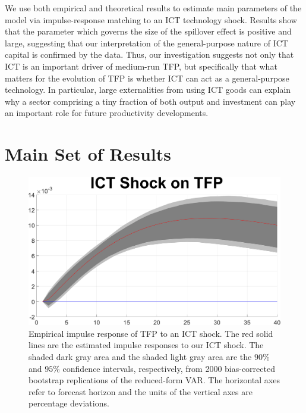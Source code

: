 \documentclass[12pt]{article}
\begin{document}
We use both empirical and theoretical results to estimate main parameters of the model via impulse-response matching to an ICT technology shock. Results show that the parameter which governs the size of the spillover effect is positive and large, suggesting that our interpretation of the general-purpose nature of ICT capital is confirmed by the data. Thus, our investigation suggests not only that ICT is an important driver of medium-run TFP, but specifically that what matters for the evolution of TFP is whether ICT can act as a general-purpose technology. In particular, large externalities from using ICT goods can explain why a sector comprising a tiny fraction of both output and investment can play an important role for future productivity developments.











\newpage


\appendix 

\section{Main Set of Results}\label{section:mainSetResults}

	\begin{figure}[h!]
		\begin{center}
\includegraphics[scale=0.35]{MainFigures/fig_ICT_Shock_on_TFP_empirical_noH}
		\caption{Empirical impulse response of TFP to an ICT shock. The red solid lines are the estimated impulse responses to our ICT shock. The shaded dark gray area and the shaded light gray area are the $90$\% and $95$\% confidence intervals, respectively, from 2000 bias-corrected bootstrap replications of the reduced-form VAR. The horizontal axes refer to forecast horizon and the units of the vertical axes are percentage deviations.}
		\label{fig:TFP_main}
	\end{center}
\end{figure}
\end{document}
